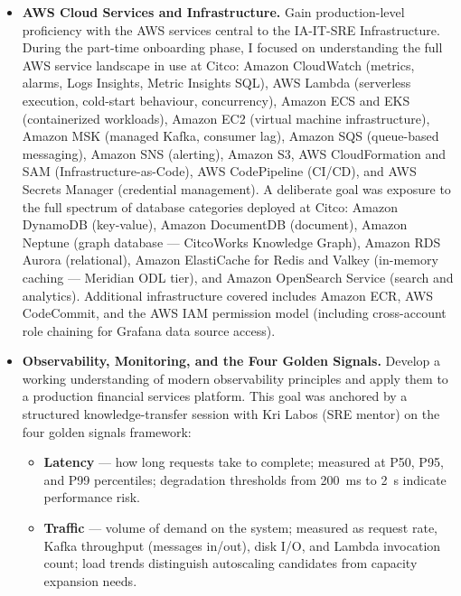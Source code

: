 \begin{itemize}

    \item \textbf{AWS Cloud Services and Infrastructure.}
          Gain production-level proficiency with the AWS services central
          to the IA-IT-SRE Infrastructure. During the part-time onboarding
          phase, I focused on understanding the full AWS service landscape
          in use at Citco: Amazon CloudWatch (metrics, alarms, Logs Insights,
          Metric Insights SQL), AWS Lambda (serverless execution, cold-start
          behaviour, concurrency), Amazon ECS and EKS (containerized
          workloads), Amazon EC2 (virtual machine infrastructure),
          Amazon MSK (managed Kafka, consumer lag), Amazon SQS
          (queue-based messaging), Amazon SNS (alerting), Amazon S3,
          AWS CloudFormation and SAM (Infrastructure-as-Code), AWS
          CodePipeline (CI/CD), and AWS Secrets Manager (credential
          management). A deliberate goal was exposure to the full spectrum
          of database categories deployed at Citco: Amazon DynamoDB
          (key-value), Amazon DocumentDB (document), Amazon Neptune
          (graph database --- CitcoWorks Knowledge Graph), Amazon RDS
          Aurora (relational), Amazon ElastiCache for Redis and Valkey
          (in-memory caching --- Meridian ODL tier), and Amazon OpenSearch
          Service (search and analytics). Additional infrastructure covered
          includes Amazon ECR, AWS CodeCommit, and the AWS IAM permission
          model (including cross-account role chaining for Grafana
          data source access).

    \item \textbf{Observability, Monitoring, and the Four Golden Signals.}
          Develop a working understanding of modern observability principles
          and apply them to a production financial services platform. This
          goal was anchored by a structured knowledge-transfer session with
          Kri Labos (SRE mentor) on the four golden signals framework:

          \begin{itemize}
              \item \textbf{Latency} --- how long requests take to complete;
                    measured at P50, P95, and P99 percentiles; degradation
                    thresholds from 200~ms to 2~s indicate performance risk.

              \item \textbf{Traffic} --- volume of demand on the system;
                    measured as request rate, Kafka throughput (messages
                    in/out), disk I/O, and Lambda invocation count; load
                    trends distinguish autoscaling candidates from capacity
                    expansion needs.


\end{itemize}
\end{itemize}
